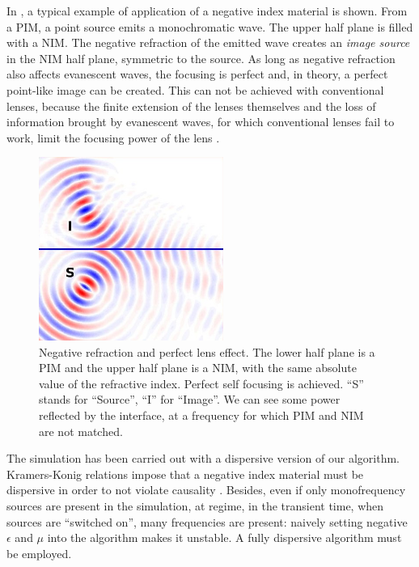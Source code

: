 In , a typical example of application of a
negative index material is shown. From a PIM, a point source emits a
monochromatic wave. The upper half plane is filled with a NIM. The
negative refraction of the emitted wave creates an \emph{image source}
in the NIM half plane, symmetric to the source. As long as negative
refraction also affects evanescent waves, the focusing is perfect and,
in theory, a perfect point-like image can be created. This can not be
achieved with conventional lenses, because the finite extension of
the lenses themselves and the loss of information brought by evanescent
waves, for which conventional lenses fail to work, limit the focusing
power of the lens \cite{born_principles}.

\begin{figure}[htbp]
  \begin{center}
    \includegraphics[height=6cm]{pics/nim_lens}
  \end{center}
  \caption{Negative refraction and perfect lens effect. The lower half
    plane is a PIM and the upper half plane is a NIM, with the same
    absolute value of the refractive index. Perfect self focusing is
    achieved. ``S'' stands for ``Source'', ``I'' for ``Image''. We can
    see some power reflected by the interface, at a frequency for
    which PIM and NIM are not matched.}
  \label{fig:nim_lens}
\end{figure}

The simulation has been carried out with a dispersive version of our
algorithm. Kramers-Konig relations impose that a negative index
material must be dispersive in order to not violate causality
\cite{jackson_classical}. Besides, even if only monofrequency sources
are present in the simulation, at regime, in the transient time, when
sources are ``switched on'', many frequencies are present: naively
setting negative $\epsilon$ and $\mu$ into the algorithm makes it
unstable. A fully dispersive algorithm must be employed.

